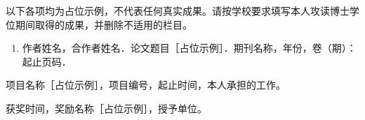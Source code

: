 \begin{resume}
以下各项均为占位示例，不代表任何真实成果。请按学校要求填写本人攻读博士学位期间取得的成果，并删除不适用的栏目。
\begin{enumerate}
\item 作者姓名，合作者姓名．论文题目［占位示例］．期刊名称，年份，卷（期）：起止页码．
\end{enumerate}
\begin{projects}
\item 项目名称［占位示例］，项目编号，起止时间，本人承担的工作。
\end{projects}
\begin{honours}
\item 获奖时间，奖励名称［占位示例］，授予单位。
\end{honours}
\end{resume}
